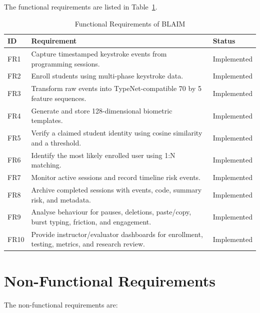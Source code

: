 The functional requirements are listed in Table~\ref{tab:functional-requirements}.

\begin{table}[H]
  \centering
  \caption{Functional Requirements of BLAIM}
  \label{tab:functional-requirements}
  \begin{singlespace}
  \begin{tabularx}{\textwidth}{@{}p{2.0cm}p{9.8cm}p{2.2cm}@{}}
    \toprule
    \textbf{ID} & \textbf{Requirement} & \textbf{Status} \\
    \midrule
    FR1 & Capture timestamped keystroke events from programming sessions. & Implemented \\
    FR2 & Enroll students using multi-phase keystroke data. & Implemented \\
    FR3 & Transform raw events into TypeNet-compatible 70 by 5 feature sequences. & Implemented \\
    FR4 & Generate and store 128-dimensional biometric templates. & Implemented \\
    FR5 & Verify a claimed student identity using cosine similarity and a threshold. & Implemented \\
    FR6 & Identify the most likely enrolled user using 1:N matching. & Implemented \\
    FR7 & Monitor active sessions and record timeline risk events. & Implemented \\
    FR8 & Archive completed sessions with events, code, summary risk, and metadata. & Implemented \\
    FR9 & Analyse behaviour for pauses, deletions, paste/copy, burst typing, friction, and engagement. & Implemented \\
    FR10 & Provide instructor/evaluator dashboards for enrollment, testing, metrics, and research review. & Implemented \\
    \bottomrule
  \end{tabularx}
  \end{singlespace}
\end{table}

\section{Non-Functional Requirements}
\label{sec:non-functional-requirements}

The non-functional requirements are:

